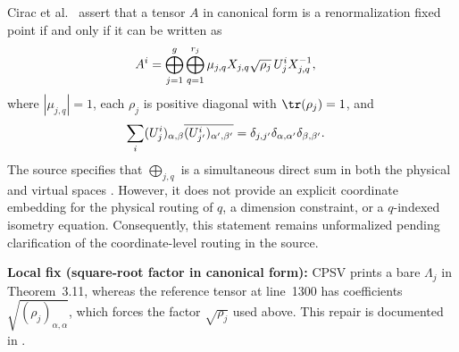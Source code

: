 \begin{theorem}
    \label{thm:cpsv_charact_mps_status}
    \notready
    Cirac et al.~\cite[Theorem~3.11]{Cirac2016MPDO_arXiv} assert that a tensor $A$
    in canonical form is a renormalization fixed point if and only if it can be
    written as
    \begin{align}
        A^i
         & =\bigoplus_{j=1}^g\bigoplus_{q=1}^{r_j}
        \mu_{j,q}X_{j,q}\sqrt{\rho_j}\,U_j^iX_{j,q}^{-1},
        \notag
    \end{align}
    where $|\mu_{j,q}|=1$, each $\rho_j$ is positive diagonal with
    $\tr(\rho_j)=1$, and
    \begin{align}
        \sum_i(U_j^i)_{\alpha,\beta}
        \overline{(U_{j'}^i)_{\alpha',\beta'}}
         & =\delta_{j,j'}\delta_{\alpha,\alpha'}\delta_{\beta,\beta'}.
        \notag
    \end{align}
    The source specifies that $\bigoplus_{j,q}$ is a simultaneous direct sum in
    both the physical and virtual spaces \cite[lines~561--562]{Cirac2016MPDO_arXiv}.
    However, it does not provide an explicit coordinate embedding for the physical
    routing of $q$, a dimension constraint, or a $q$-indexed isometry equation.
    Consequently, this statement remains unformalized pending clarification of the
    coordinate-level routing in the source.

    \textbf{Local fix (square-root factor in canonical form):}
    CPSV prints a bare $\Lambda_j$ in Theorem~3.11, whereas the reference tensor
    at line~1300 has coefficients $\sqrt{(\rho_j)_{\alpha,\alpha}}$, which
    forces the factor $\sqrt{\rho_j}$ used above. This repair is documented in
    \cite{gap:cpsv16_rfp_isometry_scope}.
\end{theorem}
